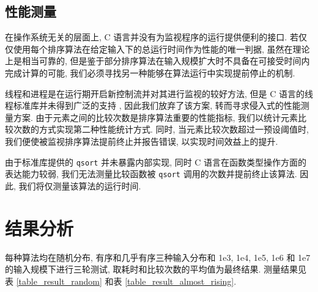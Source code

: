 \documentclass[12pt]{article}
\begin{document}
\subsection{性能测量}

在操作系统无关的层面上, C 语言并没有为监视程序的运行提供便利的接口. 若仅仅使用每个排序算法在给定输入下的总运行时间作为性能的唯一判据, 虽然在理论上是相当可靠的, 但是鉴于部分排序算法在输入规模扩大时不具备在可接受时间内完成计算的可能, 我们必须寻找另一种能够在算法运行中实现提前停止的机制.

线程和进程是在运行期开启新控制流并对其进行监视的较好方法, 但是 C 语言的线程标准库并未得到广泛的支持 \cite{bib_msvc_threads}, 因此我们放弃了该方案, 转而寻求侵入式的性能测量方案. 由于元素之间的比较次数是排序算法重要的性能指标, 我们以统计元素比较次数的方式实现第二种性能统计方式. 同时, 当元素比较次数超过一预设阈值时, 我们便使被监视排序算法提前终止并报告错误, 以实现时间效益上的提升.

由于标准库提供的 \texttt{qsort} 并未暴露内部实现, 同时 C 语言在函数类型操作方面的表达能力较弱, 我们无法测量比较函数被 \texttt{qsort} 调用的次数并提前终止该算法. 因此, 我们将仅测量该算法的运行时间.

\section{结果分析}

每种算法均在随机分布, 有序和几乎有序三种输入分布和 1e3, 1e4, 1e5, 1e6 和 1e7 的输入规模下进行三轮测试, 取耗时和比较次数的平均值为最终结果. 测量结果见表 \ref{table_result_random} 和表 \ref{table_result_almost_rising}.
\end{document}
